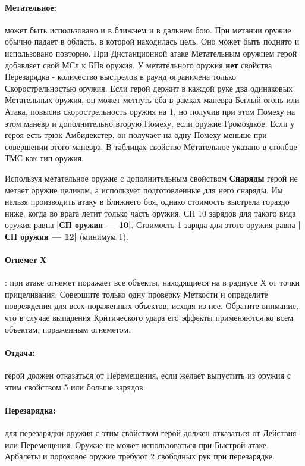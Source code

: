 \paragraph{Метательное:} может быть использовано и в ближнем и в дальнем бою. При метании оружие обычно падает в область, в которой находилась цель. Оно может быть поднято и использовано повторно. При Дистанционной атаке Метательным оружием герой добавляет свой МСл к БПв оружия. У метательного оружия \textbf{нет} свойства Перезарядка - количество выстрелов в раунд ограничена только Скорострельностью оружия. Если герой держит в каждой руке два одинаковых Метательных оружия, он может метнуть оба в рамках маневра Беглый огонь или Атака, повысив скорострельность оружия на 1, но получив при этом Помеху на этом маневр и дополнительно вторую Помеху, если оружие Громоздкое. Если у героя есть трюк Амбидекстер, он получает на одну Помеху меньше при совершении этого маневра. В таблицах свойство Метательное указано в столбце ТМС как тип оружия.
\begin{tcolorbox}
Используя метательное оружие с дополнительным свойством \textbf{Снаряды} герой не метает оружие целиком, а использует подготовленные для него снаряды. Им нельзя производить атаку в Ближнего боя, однако стоимость выстрела гораздо ниже, когда во врага летит только часть оружия. СП 10 зарядов для такого вида оружия равна \textbf{|СП оружия — 10|}. Стоимость 1 заряда для этого оружия равна \textbf{|СП оружия — 12|} (минимум 1).
\end{tcolorbox}
\paragraph{Огнемет Х}: при атаке огнемет поражает все объекты, находящиеся на в радиусе Х от точки прицеливания. Совершите только одну проверку Меткости и определите повреждения для всех пораженных объектов, исходя из нее. Обратите внимание, что в случае выпадения Критического удара его эффекты применяются ко всем объектам, пораженным огнеметом.
\paragraph{Отдача:} герой должен отказаться от Перемещения, если желает выпустить из оружия с этим свойством 5 или больше зарядов.
\paragraph{Перезарядка:} для перезарядки оружия с этим свойством герой должен отказаться от Действия или Перемещения. Оружие не может использоваться при Быстрой атаке. Арбалеты и пороховое оружие требуют 2 свободных рук при перезарядке.
